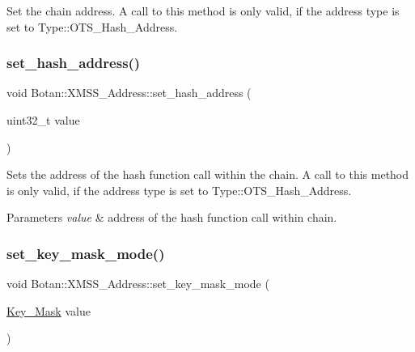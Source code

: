 Set the chain address. A call to this method is only valid, if the address type is set to Type\+::\+O\+T\+S\+\_\+\+Hash\+\_\+\+Address. \mbox{\label{class_botan_1_1_x_m_s_s___address_a0a5d46d9a17f3a39808356d079b592fa}} 
\subsubsection{\texorpdfstring{set\+\_\+hash\+\_\+address()}{set\_hash\_address()}}
{\footnotesize\ttfamily void Botan\+::\+X\+M\+S\+S\+\_\+\+Address\+::set\+\_\+hash\+\_\+address (\begin{DoxyParamCaption}\item[{uint32\+\_\+t}]{value }\end{DoxyParamCaption})\hspace{0.3cm}{\ttfamily [inline]}}

Sets the address of the hash function call within the chain. A call to this method is only valid, if the address type is set to Type\+::\+O\+T\+S\+\_\+\+Hash\+\_\+\+Address.


\begin{DoxyParams}{Parameters}
{\em value} & address of the hash function call within chain. \\
\hline
\end{DoxyParams}
\mbox{\label{class_botan_1_1_x_m_s_s___address_a12a0bcf65685053363b944be811f57db}} 
\subsubsection{\texorpdfstring{set\+\_\+key\+\_\+mask\+\_\+mode()}{set\_key\_mask\_mode()}}
{\footnotesize\ttfamily void Botan\+::\+X\+M\+S\+S\+\_\+\+Address\+::set\+\_\+key\+\_\+mask\+\_\+mode (\begin{DoxyParamCaption}\item[{\hyperlink{class_botan_1_1_x_m_s_s___address_a85146c0c3e049f62c413194049f501e3}{Key\+\_\+\+Mask}}]{value }\end{DoxyParamCaption})\hspace{0.3cm}{\ttfamily [inline]}}

